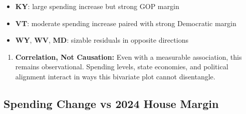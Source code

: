 \documentclass[
  11pt,
]{article}
\providecommand{\tightlist}{%
  \setlength{\itemsep}{0pt}\setlength{\parskip}{0pt}}
\begin{document}
\begin{itemize}
\tightlist
\item
  \textbf{KY}: large spending increase but strong GOP margin
\item
  \textbf{VT}: moderate spending increase paired with strong Democratic
  margin
\item
  \textbf{WY}, \textbf{WV}, \textbf{MD}: sizable residuals in opposite
  directions
\end{itemize}

\begin{enumerate}
\def\labelenumi{\arabic{enumi}.}
\setcounter{enumi}{3}
\tightlist
\item
  \textbf{Correlation, Not Causation:} Even with a measurable
  association, this remains observational. Spending levels, state
  economies, and political alignment interact in ways this bivariate
  plot cannot disentangle.
\end{enumerate}

\subsection{Spending Change vs 2024 House
Margin}\label{spending-change-vs-2024-house-margin}
\end{document}
